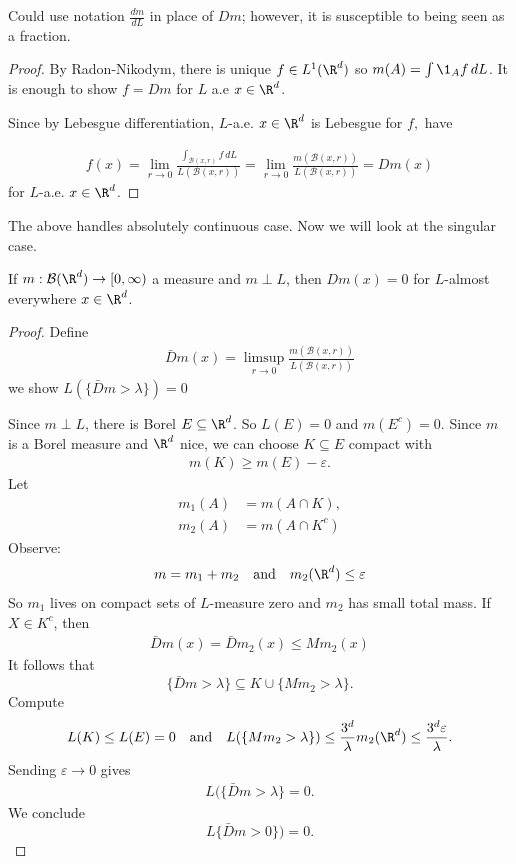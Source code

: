 \begin{notation}
	Could use notation $\frac{dm}{dL}$ in place of $Dm$; however, it is susceptible to being seen as a fraction.
\end{notation}

\begin{proof}
	By Radon-Nikodym, there is unique $f \in L^1(\R^d)$ so $m(A) = \int \1_A f \, dL$.
	It is enough to show  $f = D m$ for $L$ a.e $x \in \R^d$.

	Since  by Lebesgue differentiation, $L$-a.e. $x \in \R^d$ is Lebesgue for $f,$ have

	\begin{align*}
		f(x) = \lim_{r \to 0} \frac{\int_{\mathcal{B}(x, r)} f \, dL}{L(\mathcal{B}(x,r))} = \lim_{r \to 0} \frac{m(\mathcal{B}(x,r))}{L(\mathcal{B}(x,r))} = D m(x)
	\end{align*}
	for $L$-a.e. $x \in \R^d$.
\end{proof}

The above handles absolutely continuous case. Now we will look at the singular case.

\begin{theorem}
	If $m : \mathcal{B}(\R^d) \to [0,\infty)$ a measure and $m \perp L$,
	then $D m(x) = 0$ for $L$-almost everywhere $x \in \R^d$.
\end{theorem}

\begin{proof}
	Define
	\begin{align*}
		\bar{D} m(x) = \limsup_{r \to 0} \frac{m(\mathcal{B}(x,r))}{L(\mathcal{B}(x,r))}
	\end{align*}
we show $L( \{ \bar{D}m > \lambda \}) = 0$

Since $m \perp L$, there is Borel $E \subseteq \R^d$. So $L(E) = 0$ and $m(E^c) = 0$.
Since  $m$ is a Borel measure and $\R^d$ nice, we can choose $K \subseteq  E$ compact with
\begin{align*}
	m(K) \geq m(E) - \varepsilon.
\end{align*}
Let
\begin{align*}
	m_1 (A) &= m(A \cap K), \\
	m_2 (A)	&= m( A \cap K^c)
\end{align*}
Observe:
\begin{align*}
	m = m_1 + m_2 \quad \text{and} \quad
	m_2(\R^d)\leq \varepsilon
\end{align*}
So $m_1$ lives on compact sets of $L$-measure zero and $m_2$ has small total mass.
If $X \in K^c$, then
\begin{align*}
	\bar{D}m(x) = \bar D m_2 (x) \leq M m_2 (x)
\end{align*}
It follows that 
\[
	\{ \bar{D} m > \lambda \} \subseteq  K \cup \{ M m_2 > \lambda \}. 
\] 
Compute
\begin{align*}
	L (K) \leq L(E) = 0 \quad \text{and} \quad
	L (\{ M m_2 > \lambda \}) \leq \frac{3^d}{\lambda} m_2 (\R^d) \leq \frac{3^d \varepsilon}{\lambda}.
\end{align*}
Sending $\varepsilon \to 0$ gives
\begin{align*}
	L ( \{ \bar{D} m > \lambda \} = 0.
\end{align*}
We conclude
\[
	L\{ \bar{D} m > 0 \}) = 0.
\]
\end{proof}

